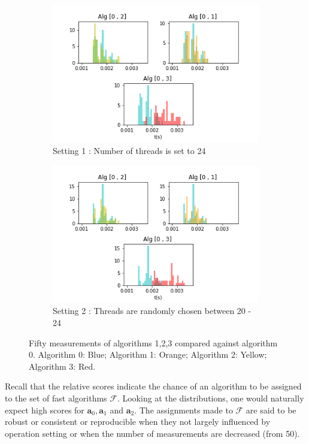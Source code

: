 \documentclass[conference]{IEEEtran}
\begin{document}
\begin{figure}
	\centering
	\begin{subfigure}[b]{0.5\textwidth}
		\includegraphics[width=1\linewidth]{fig/f_noise}
		\caption{Setting 1 : Number of threads is set to 24}
		\label{fig:Ng1}
	\end{subfigure}
	
	\begin{subfigure}[b]{0.5\textwidth}
		\includegraphics[width=1\linewidth]{fig/f}
		\caption{Setting 2 : Threads are randomly chosen between 20 - 24}
		\label{fig:Ng2} 
	\end{subfigure}
	\caption{Fifty measurements of algorithms 1,2,3 compared against algorithm 0.  Algorithm 0: Blue;  Algorithm 1: Orange; Algorithm 2: Yellow; Algorithm 3: Red.}
	\label{fig:d}
\end{figure}

Recall that the relative scores indicate the chance of an algorithm to be assigned to the set of fast algorithms $\mathcal{F}$. Looking at the distributions, one would naturally expect high scores for $\mathbf{a}_0, \mathbf{a}_1$ and $\mathbf{a}_2$. The assignments made to $\mathcal{F}$ are said to be robust or consistent or reproducible when they not largely influenced by operation setting or when the number of measurements are decreased (from 50).
\end{document}
